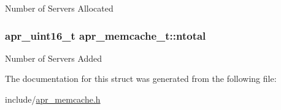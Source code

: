 Number of Servers Allocated \hypertarget{structapr__memcache__t_a94e1353d23d4d02a18a9f0ca0e90005d}{
\subsubsection[{ntotal}]{\setlength{\rightskip}{0pt plus 5cm}apr\-\_\-uint16\-\_\-t apr\-\_\-memcache\-\_\-t\-::ntotal}}\label{structapr__memcache__t_a94e1353d23d4d02a18a9f0ca0e90005d}
Number of Servers Added 

The documentation for this struct was generated from the following file\-:\begin{DoxyCompactItemize}
\item 
include/\hyperlink{apr__memcache_8h}{apr\-\_\-memcache.\-h}\end{DoxyCompactItemize}
